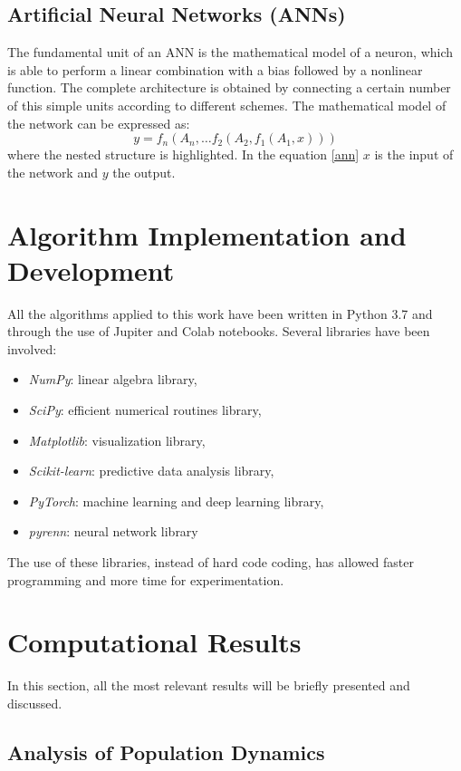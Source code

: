 \documentclass[]{article}
\begin{document}
\subsection{Artificial Neural Networks (ANNs)}
The fundamental unit of an ANN is the mathematical model of a neuron, which is able to perform a linear combination with a bias followed by a nonlinear function. The complete architecture is obtained by connecting a certain number of this simple units according to different schemes. The mathematical model of the network can be expressed as:
\begin{equation}\label{ann}
y = f_n(A_n, \dots f_2(A_2, f_1(A_1, x)))
\end{equation}
where the nested structure is highlighted. In the equation \eqref{ann} $x$ is the input of the network and $y$ the output.

\section{Algorithm Implementation and Development}
All the algorithms applied to this work have been written in Python 3.7 and through the use of Jupiter and Colab notebooks. Several libraries have been involved:
\begin{itemize}
    \item \textit{NumPy}: linear algebra library,
    \item \textit{SciPy}: efficient numerical routines library,
    \item \textit{Matplotlib}: visualization library,
    \item \textit{Scikit-learn}: predictive data analysis library,
    \item \textit{PyTorch}: machine learning and deep learning library,
    \item \textit{pyrenn}: neural network library
\end{itemize}
The use of these libraries, instead of hard code coding, has allowed faster programming and more time for experimentation.

\section{Computational Results}
In this section, all the most relevant results will be briefly presented and discussed.

\subsection{Analysis of Population Dynamics}
\end{document}
